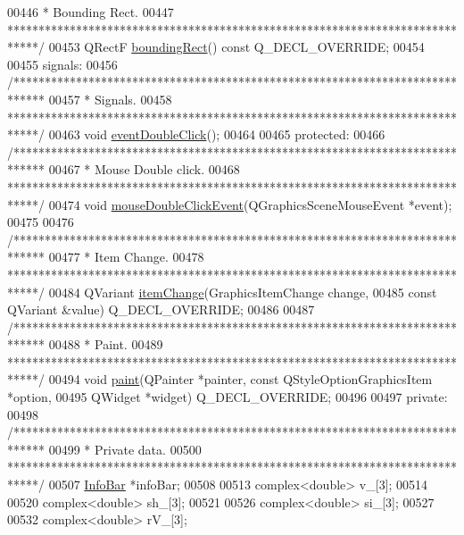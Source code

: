 \begin{DoxyCode}
00446 \textcolor{comment}{  * Bounding Rect.}
00447 \textcolor{comment}{  *****************************************************************************/}
00453   QRectF \hyperlink{group___models_ga8279d8109019cc7e139e2023690496be}{boundingRect}() const Q\_DECL\_OVERRIDE;
00454 
00455 signals:
00456   \textcolor{comment}{/*****************************************************************************}
00457 \textcolor{comment}{  * Signals.}
00458 \textcolor{comment}{  *****************************************************************************/}
00463   \textcolor{keywordtype}{void} \hyperlink{class_bar_a66bcbd19582dddee7e171ae5a4475f4b}{eventDoubleClick}();
00464 
00465 protected:
00466   \textcolor{comment}{/*****************************************************************************}
00467 \textcolor{comment}{  * Mouse Double click.}
00468 \textcolor{comment}{  *****************************************************************************/}
00474   \textcolor{keywordtype}{void} \hyperlink{group___models_ga1945e7b4401fa9ad7475274d9fb12a72}{mouseDoubleClickEvent}(QGraphicsSceneMouseEvent *event);
00475 
00476   \textcolor{comment}{/*****************************************************************************}
00477 \textcolor{comment}{  * Item Change.}
00478 \textcolor{comment}{  *****************************************************************************/}
00484   QVariant \hyperlink{group___models_gad97a82d618ee0c51a9a36e44339c69e6}{itemChange}(GraphicsItemChange change,
00485                       const QVariant &value) Q\_DECL\_OVERRIDE;
00486 
00487   \textcolor{comment}{/*****************************************************************************}
00488 \textcolor{comment}{  * Paint.}
00489 \textcolor{comment}{  *****************************************************************************/}
00494   \textcolor{keywordtype}{void} \hyperlink{group___models_gacbb6dbac607412c9c1f9dfcd0cd4d432}{paint}(QPainter *painter, const QStyleOptionGraphicsItem *option,
00495              QWidget *widget) Q\_DECL\_OVERRIDE;
00496 
00497 private:
00498   \textcolor{comment}{/*****************************************************************************}
00499 \textcolor{comment}{  * Private data.}
00500 \textcolor{comment}{  *****************************************************************************/}
00507   \hyperlink{class_info_bar}{InfoBar} *infoBar;
00508 
00513   complex<\textcolor{keywordtype}{double}> v\_[3];
00514 
00520   complex<\textcolor{keywordtype}{double}> sh\_[3];
00521 
00526   complex<\textcolor{keywordtype}{double}> si\_[3];
00527 
00532   complex<\textcolor{keywordtype}{double}> rV\_[3];

\end{DoxyCode}
